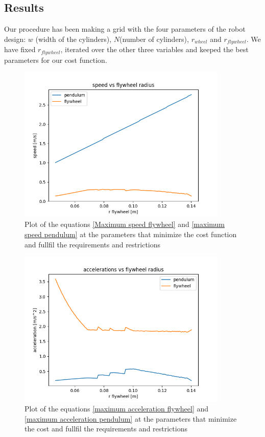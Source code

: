 \subsection{Results}
Our procedure has been making a grid with the four parameters of the robot 
design: $w$ (width of the cylinders), $N$(number of cylinders), $r_{wheel}$ and $r_{flywheel}$.
We have fixed $r_{flywheel}$, iterated over the other three variables and keeped the best parameters for our cost function.


\begin{figure}[H]
	\centering
	\includegraphics[width=10cm]{img/optimization/speed.png}
	\caption{Plot of the equations \ref{Maximum speed flywheel} and \ref{maximum speed pendulum} at the parameters that minimize the cost function and fullfil the requirements and restrictions}
	\label{fig:Speed plot}
\end{figure}

\begin{figure}[H]
	\centering
	\includegraphics[width=10cm]{img/optimization/acceleration.png}
	\caption{Plot of the equations \ref{maximum acceleration flywheel} and \ref{maximum acceleration pendulum} at the parameters that minimize the cost and fullfil the requirements and restrictions}
	\label{fig:Speed plot}
\end{figure}

